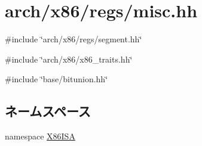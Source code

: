 \hypertarget{arch_2x86_2regs_2misc_8hh}{
\section{arch/x86/regs/misc.hh}
\label{arch_2x86_2regs_2misc_8hh}
}
{\ttfamily \#include \char`\"{}arch/x86/regs/segment.hh\char`\"{}}\par
{\ttfamily \#include \char`\"{}arch/x86/x86\_\-traits.hh\char`\"{}}\par
{\ttfamily \#include \char`\"{}base/bitunion.hh\char`\"{}}\par
\subsection*{ネームスペース}
\begin{DoxyCompactItemize}
\item 
namespace \hyperlink{namespaceX86ISA}{X86ISA}
\end{DoxyCompactItemize}
